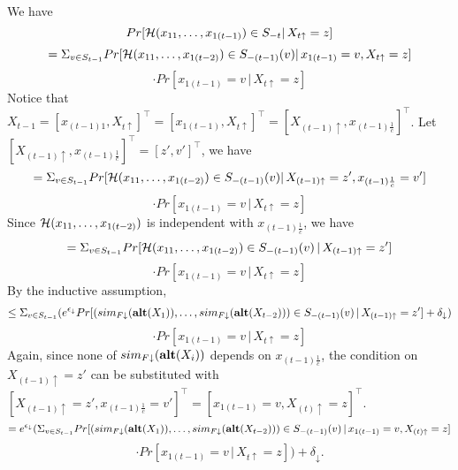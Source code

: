 \documentclass[11pt]{article}
\begin{document}
We have 
\[
Pr[{\cal H} (x_{11},\dots, x_{1(t-1)})  \in S_{-t} |\, X_{t\uparrow} =z ]
\]
\[
=\Sigma_{v\in S_{t-1}} Pr[{\cal H} (x_{11},\dots, x_{1(t-2)})  \in S_{-(t-1)}(v) |\, x_{1(t-1)}=v, X_{t\uparrow} =z ]  
\]
\[
\cdot Pr[x_{1(t-1)}=v \,|\, X_{t\uparrow} =z]
\]
Notice that $X_{t-1}=[x_{(t-1)1}, X_{t\uparrow} ]^{\top}=[x_{1(t-1)}, X_{t\uparrow} ]^{\top}=[X_{(t-1)\uparrow}, x_{(t-1) \frac{1}{c}}]^{\top}$. Let $[X_{(t-1)\uparrow}, x_{(t-1) \frac{1}{c}}]^{\top} =[z', v']^{\top}$, we have
\[
=\Sigma_{v\in S_{t-1}} Pr[{\cal H} (x_{11},\dots, x_{1(t-2)})  \in S_{-(t-1)}(v) |\, X_{(t-1)\uparrow}=z', x_{(t-1) \frac{1}{c}}=v' ]  
\]
\[
\cdot Pr[x_{1(t-1)}=v \,|\, X_{t\uparrow} =z]
\]
Since ${\cal H} (x_{11},\dots, x_{1(t-2)})$ is independent with $x_{(t-1) \frac{1}{c}}$, we have
\[
=\Sigma_{v\in S_{t-1}} Pr[{\cal H} (x_{11},\dots, x_{1(t-2)})  \in S_{-(t-1)}(v)\, |\, X_{(t-1)\uparrow}=z' ]  
\]
\[
\cdot Pr[x_{1(t-1)}=v \,|\, X_{t\uparrow} =z]
\]
By the inductive assumption,
\[
\leq \Sigma_{v\in S_{t-1}} (e^{\epsilon_{\downarrow}}Pr[(sim_{F\downarrow} ({\bf alt}(X_{1}) ), \dots, sim_{F\downarrow} ({\bf alt}(X_{t-2}))) \in S_{-(t-1)} (v)\,|\, X_{(t-1)\uparrow}=z' ]  +\delta_{\downarrow})
\]
\[
\cdot Pr[x_{1(t-1)}=v \,|\, X_{t\uparrow} =z]
\]
Again, since none of $sim_{F\downarrow} ({\bf alt}(X_{i}) )$ depends on $x_{(t-1) \frac{1}{c}}$, the condition on $X_{(t-1)\uparrow}=z'$ can be substituted with $[X_{(t-1)\uparrow}=z', x_{(t-1) \frac{1}{c}}=v']^{\top} = [x_{1(t-1)}=v, X_{(t)\uparrow}=z]^{\top}$.
\[
=e^{\epsilon_{\downarrow}} (\Sigma_{v\in S_{t-1}} Pr[(sim_{F\downarrow} ({\bf alt}(X_{1}) ), \dots, sim_{F\downarrow} ({\bf alt}(X_{t-2}))) \in S_{-(t-1)} (v)\,|\,  x_{1(t-1)}=v, X_{(t)\uparrow}=z ]
\]
\[
\cdot Pr[x_{1(t-1)}=v \,|\, X_{t\uparrow} =z]) + \delta_{\downarrow}.
\]
 
\end{document}

